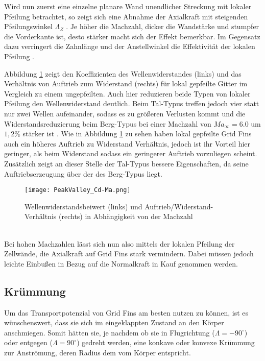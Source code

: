 Wird nun zuerst eine einzelne planare Wand unendlicher Streckung mit lokaler Pfeilung betrachtet, so zeigt sich eine Abnahme der Axialkraft mit steigenden Pfeilungswinkel $\Lambda_Z$ \cite{PeakValley}. Je höher die Machzahl, dicker die Wandstärke und stumpfer die Vorderkante ist, desto stärker macht sich der Effekt bemerkbar. Im Gegensatz dazu verringert die Zahnlänge und der Anstellwinkel die Effektivität der lokalen Pfeilung \cite{PeakValley}.

Abbildung \ref{abb_PeakValley-Ma} zeigt den Koeffizienten des Wellenwiderstandes (links) und das Verhältnis von Auftrieb zum Widerstand (rechts) für lokal gepfeilte Gitter im Vergleich zu einem ungepfeilten.
Auch hier reduzieren beide Typen von lokaler Pfeilung den Wellenwiderstand deutlich. Beim Tal-Typus treffen jedoch vier statt nur zwei Wellen aufeinander, sodass es zu größeren Verlusten kommt und die Widerstandsreduzierung beim Berg-Typus bei einer Machzahl von $Ma_\infty=6.0$ um $1,2\%$ stärker ist \cite{PeakValley}.
Wie in Abbildung \ref{abb_PeakValley-Ma} zu sehen haben lokal gepfeilte Grid Fins auch ein höheres Auftrieb zu Widerstand Verhältnis, jedoch ist ihr Vorteil hier geringer, als beim Widerstand sodass ein geringerer Auftrieb vorzuliegen scheint. Zusätzlich zeigt an dieser Stelle der Tal-Typus bessere Eigenschaften, da seine Auftriebserzeugung über der des Berg-Typus liegt. 
\begin{figure}[h]
	\centering
	\texttt{[image: PeakValley\_Cd-Ma.png]}
	\begin{flushright}
	\end{flushright}
	\caption{Wellenwiderstandsbeiwert (links) und Auftrieb/Widerstand-Verhältnis (rechts) in Abhängigkeit von der Machzahl}
	\label{abb_PeakValley-Ma}
\end{figure}\\
Bei hohen Machzahlen lässt sich nun also mittels der lokalen Pfeilung der Zellwände, die Axialkraft auf Grid Fins stark vermindern. Dabei müssen jedoch leichte Einbußen in Bezug auf die Normalkraft in Kauf genommen werden.
\subsection{Krümmung}
Um das Transportpotenzial von Grid Fins am besten nutzen zu können, ist es wünschenswert, dass sie sich im eingeklappten Zustand an den Körper anschmiegen. Somit hätten sie, je nachdem ob sie in Flugrichtung ($\Lambda = -90^\circ$) oder entgegen ($\Lambda = 90^\circ$) gedreht werden, eine konkave oder konvexe Krümmung zur Anströmung, deren Radius dem vom Körper entspricht.


